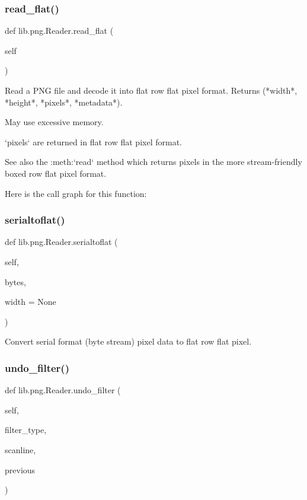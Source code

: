 \subsubsection{\texorpdfstring{read\+\_\+flat()}{read\_flat()}}
{\footnotesize\ttfamily def lib.\+png.\+Reader.\+read\+\_\+flat (\begin{DoxyParamCaption}\item[{}]{self }\end{DoxyParamCaption})}

\begin{DoxyVerb}Read a PNG file and decode it into flat row flat pixel format.
Returns (*width*, *height*, *pixels*, *metadata*).

May use excessive memory.

`pixels` are returned in flat row flat pixel format.

See also the :meth:`read` method which returns pixels in the
more stream-friendly boxed row flat pixel format.
\end{DoxyVerb}
 Here is the call graph for this function\+:
\mbox{\label{classlib_1_1png_1_1_reader_a95f04a6a71588837a20247ce4a34423f}} 
\subsubsection{\texorpdfstring{serialtoflat()}{serialtoflat()}}
{\footnotesize\ttfamily def lib.\+png.\+Reader.\+serialtoflat (\begin{DoxyParamCaption}\item[{}]{self,  }\item[{}]{bytes,  }\item[{}]{width = {\ttfamily None} }\end{DoxyParamCaption})}

\begin{DoxyVerb}Convert serial format (byte stream) pixel data to flat row
flat pixel.
\end{DoxyVerb}
 \mbox{\label{classlib_1_1png_1_1_reader_af232a3eecd4d1644beba2d144feb76c7}} 
\subsubsection{\texorpdfstring{undo\+\_\+filter()}{undo\_filter()}}
{\footnotesize\ttfamily def lib.\+png.\+Reader.\+undo\+\_\+filter (\begin{DoxyParamCaption}\item[{}]{self,  }\item[{}]{filter\+\_\+type,  }\item[{}]{scanline,  }\item[{}]{previous }\end{DoxyParamCaption})}

